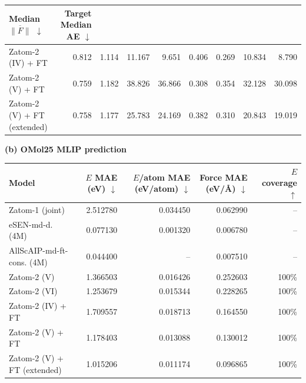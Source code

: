 \documentclass{article} %
\begin{document}
\begin{table}[!t]
{\begin{tabular}{@{}lrrrrrrrr@{}}
    \shortstack{Median\\$\overline{\|F\|}$ $\downarrow$} &
    \shortstack{Target\\Median AE $\downarrow$} \\
    \midrule
    Zatom-2 (IV) + FT & 0.812 & 1.114 & 11.167 & 9.651 & 0.406 & 0.269 & 10.834 & 8.790 \\
    Zatom-2 (V) + FT & 0.759 & 1.182 & 38.826 & 36.866 & 0.308 & 0.354 & 32.128 & 30.098 \\
    \midrule
    Zatom-2 (V) + FT (extended) & 0.758 & 1.177 & 25.783 & 24.169 & 0.382 & 0.310 & 20.843 & 19.019 \\
    \bottomrule
  \end{tabular}%
  }
  \par\vspace{0.25em}
  \begin{minipage}{0.98\linewidth}
  \end{minipage}

  \vspace{0.4em}
  {\textbf{(b) OMol25 MLIP prediction}\par}
  \vspace{0.25em}
  \begin{tabular*}{\linewidth}{@{\extracolsep{\fill}}lrrrr@{}}
    \toprule
    Model & $E$ MAE (eV) $\downarrow$ &
    $E$/atom MAE (eV/atom) $\downarrow$ &
    Force MAE (eV/\AA) $\downarrow$ & $E$ coverage $\uparrow$ \\
    \midrule
    Zatom-1 (joint) & 2.512780 & 0.034450 & 0.062990 & -- \\
    eSEN-md-d. (4M) & 0.077130 & 0.001320 & 0.006780 & -- \\
    AllScAIP-md-ft-cons. (4M) & 0.044400 & -- & 0.007510 & -- \\
    \midrule
    Zatom-2 (V) & 1.366503 & 0.016426 & 0.252603 & 100\% \\
    Zatom-2 (VI) & 1.253679 & 0.015344 & 0.228265 & 100\% \\
    \midrule
    Zatom-2 (IV) + FT & 1.709557 & 0.018713 & 0.164550 & 100\% \\
    Zatom-2 (V) + FT & 1.178403 & 0.013088 & 0.130012 & 100\% \\
    \midrule
    Zatom-2 (V) + FT (extended) & 1.015206 & 0.011174 & 0.096865 & 100\% \\
    \bottomrule
  \end{tabular*}


\end{table}
\end{document}
